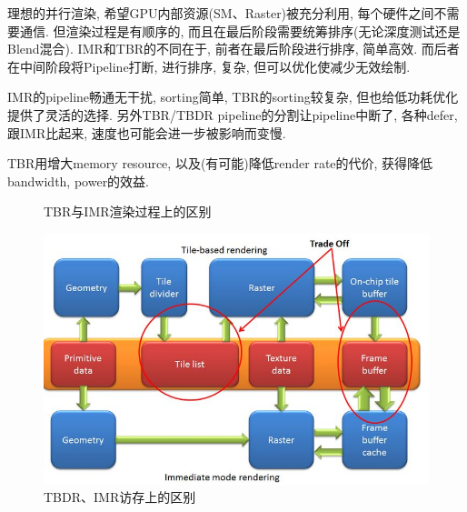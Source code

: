 \documentclass[UTF8]{ctexart}
\begin{document}
理想的并行渲染, 希望GPU内部资源(SM、Raster)被充分利用, 每个硬件之间不需要通信. 但渲染过程是有顺序的, 而且在最后阶段需要统筹排序(无论深度测试还是Blend混合). IMR和TBR的不同在于, 前者在最后阶段进行排序, 简单高效. 而后者在中间阶段将Pipeline打断, 进行排序, 复杂, 但可以优化使减少无效绘制.

\vspace*{1\baselineskip}

IMR的pipeline畅通无干扰, sorting简单, TBR的sorting较复杂, 但也给低功耗优化提供了灵活的选择. 另外TBR/TBDR pipeline的分割让pipeline中断了, 各种defer, 跟IMR比起来, 速度也可能会进一步被影响而变慢.

\vspace*{1\baselineskip}

TBR用增大memory resource, 以及(有可能)降低render rate的代价, 获得降低bandwidth, power的效益.

\begin{figure}[H]
  \centering
  \caption{TBR与IMR渲染过程上的区别\cite{render_mode_comp}}
  \label{fig: rendering_rastering}
\end{figure}

\begin{figure}[H]
  \includegraphics[width=12cm]{tbdr_imr_memory.jpg}
  \centering
  \caption{TBDR、IMR访存上的区别}
  \label{fig:tbdr}
\end{figure}
\end{document}
